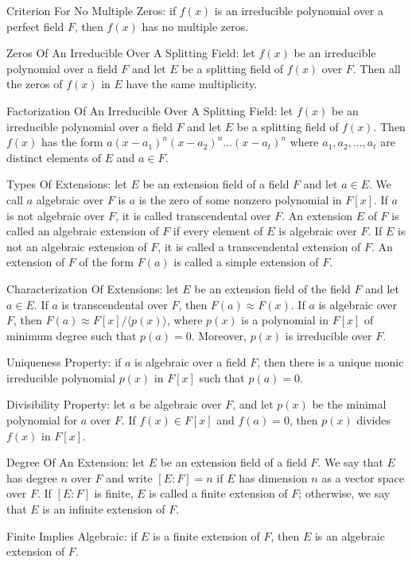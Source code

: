 Criterion For No Multiple Zeros: if $f(x)$ is an irreducible polynomial over a perfect field $F$, then $f(x)$ has no multiple zeros.

Zeros Of An Irreducible Over A Splitting Field: let $f(x)$ be an irreducible polynomial over a field $F$ and let $E$ be a splitting field of $f(x)$ over $F$. Then all the zeros of $f(x)$ in $E$ have the same multiplicity.

Factorization Of An Irreducible Over A Splitting Field: let $f(x)$ be an irreducible polynomial over a field $F$ and let $E$ be a splitting field of $f(x)$. Then $f(x)$ has the form $a(x-a_1)^n(x-a_2)^n\dots (x-a_t)^n$ where $a_1,a_2,\dots,a_t$ are distinct elements of $E$ and $a \in F$.

Types Of Extensions: let $E$ be an extension field of a field $F$ and let $a \in E$. We call $a$ algebraic over $F$ is $a$ is the zero of some nonzero polynomial in $F[x]$. If $a$ is not algebraic over $F$, it is called transcendental over $F$. An extension $E$ of $F$ is called an algebraic extension of $F$ if every element of $E$ is algebraic over $F$. If $E$ is not an algebraic extension of $F$, it is called a transcendental extension of $F$. An extension of $F$ of the form $F(a)$ is called a simple extension of $F$.

Characterization Of Extensions: let $E$ be an extension field of the field $F$ and let $a \in E$. If $a$ is transcendental over $F$, then $F(a) \approx F(x)$. If $a$ is algebraic over $F$, then $F(a) \approx F[x]/\langle p(x) \rangle$, where $p(x)$ is a polynomial in $F[x]$ of minimum degree such that $p(a)=0$. Moreover, $p(x)$ is irreducible over $F$.

Uniqueness Property: if $a$ is algebraic over a field $F$, then there is a unique monic irreducible polynomial $p(x)$ in $F[x]$ such that $p(a)=0$.

Divisibility Property: let $a$ be algebraic over $F$, and let $p(x)$ be the minimal polynomial for $a$ over $F$. If $f(x) \in F[x]$ and $f(a)=0$, then $p(x)$ divides $f(x)$ in $F[x]$.

Degree Of An Extension: let $E$ be an extension field of a field $F$. We say that $E$ has degree $n$ over $F$ and write $[E:F]=n$ if $E$ has dimension $n$ as a vector space over $F$. If $[E:F]$ is finite, $E$ is called a finite extension of $F$; otherwise, we say that $E$ is an infinite extension of $F$.

Finite Implies Algebraic: if $E$ is a finite extension of $F$, then $E$ is an algebraic extension of $F$.

